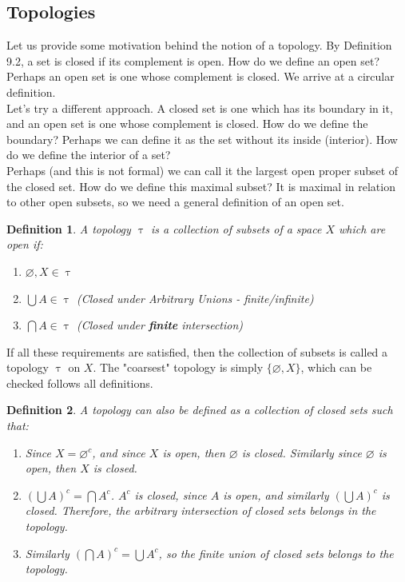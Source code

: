 \documentclass{article}
\newtheorem{defn}{Definition}[section]
\begin{document}
\medskip
\subsection{Topologies}
Let us provide some motivation behind the notion of a topology. By Definition 9.2, a set is closed if its complement is open. How do we define an open set? Perhaps an open set is one whose complement is closed. We arrive at a circular definition.\\

Let's try a different approach. A closed set is one which has its boundary in it, and an open set is one whose complement is closed. How do we define the boundary? Perhaps we can define it as the set without its inside (interior). How do we define the interior of a set?\\

Perhaps (and this is not formal) we can call it the largest open proper subset of the closed set. How do we define this maximal subset? It is maximal in relation to other open subsets, so we need a general definition of an open set.
\pagebreak
\begin{defn}
    A topology $\uptau$ is a collection of subsets of a space $X$ which are open if:
    \begin{enumerate}
        \item $\varnothing, X \in \uptau$
        \item $\bigcup A \in \uptau$ (Closed under Arbitrary Unions - finite/infinite)
        \item $\bigcap A \in \uptau$ (Closed under \textbf{finite} intersection)
    \end{enumerate}
\end{defn}
If all these requirements are satisfied, then the collection of subsets is called a topology $\uptau$ on $X$. The "coarsest" topology is simply $\{\varnothing, X\}$, which can be checked follows all definitions.

\medskip
\begin{defn}
    A topology can also be defined as a collection of closed sets such that:
    \begin{enumerate}
        \item Since $X = \varnothing^c$, and since $X$ is open, then $\varnothing$ is closed. Similarly since $\varnothing$ is open, then $X$ is closed.
        \item $(\bigcup A)^c = \bigcap A^c$. $A^c$ is closed, since $A$ is open, and similarly $(\bigcup A)^c$ is closed. Therefore, the arbitrary intersection of closed sets belongs in the topology.
        \item Similarly $(\bigcap A)^c = \bigcup A^c$, so the finite union of closed sets belongs to the topology.
    \end{enumerate}
\end{defn}
\end{document}
